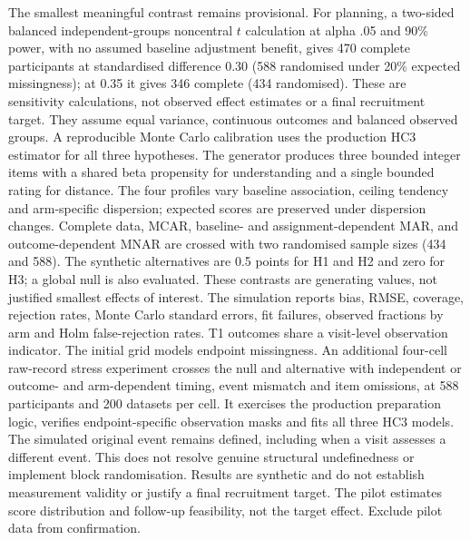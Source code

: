 \documentclass[11pt,a4paper]{article}
\begin{document}
\par The smallest meaningful contrast remains provisional. For planning, a two-sided balanced independent-groups noncentral $t$ calculation at alpha .05 and 90\% power, with no assumed baseline adjustment benefit, gives 470 complete participants at standardised difference 0.30 (588 randomised under 20\% expected missingness); at 0.35 it gives 346 complete (434 randomised). These are sensitivity calculations, not observed effect estimates or a final recruitment target. They assume equal variance, continuous outcomes and balanced observed groups. A reproducible Monte Carlo calibration uses the production HC3 estimator for all three hypotheses. The generator produces three bounded integer items with a shared beta propensity for understanding and a single bounded rating for distance. The four profiles vary baseline association, ceiling tendency and arm-specific dispersion; expected scores are preserved under dispersion changes. Complete data, MCAR, baseline- and assignment-dependent MAR, and outcome-dependent MNAR are crossed with two randomised sample sizes (434 and 588). The synthetic alternatives are 0.5 points for H1 and H2 and zero for H3; a global null is also evaluated. These contrasts are generating values, not justified smallest effects of interest. The simulation reports bias, RMSE, coverage, rejection rates, Monte Carlo standard errors, fit failures, observed fractions by arm and Holm false-rejection rates. T1 outcomes share a visit-level observation indicator. The initial grid models endpoint missingness. An additional four-cell raw-record stress experiment crosses the null and alternative with independent or outcome- and arm-dependent timing, event mismatch and item omissions, at 588 participants and 200 datasets per cell. It exercises the production preparation logic, verifies endpoint-specific observation masks and fits all three HC3 models. The simulated original event remains defined, including when a visit assesses a different event. This does not resolve genuine structural undefinedness or implement block randomisation. Results are synthetic and do not establish measurement validity or justify a final recruitment target. The pilot estimates score distribution and follow-up feasibility, not the target effect. Exclude pilot data from confirmation.
\end{document}
